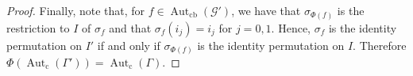 \documentclass[10pt,a4paper]{amsart}
\newcommand{\Aut}{\operatorname{Aut}}
\newcommand{\Autc}{\Aut_{\text{c}}}
\newcommand{\Autcb}{\Aut_{\text{cb}}}
\newcommand{\G}{\mathcal{G}}
\begin{document}
\begin{proof}
Finally, note that, for $f\in \Autcb(\G')$, we have that $\sigma_{\Phi(f)}$ is the restriction to $I$ of $\sigma_f$ and that $\sigma_f(i_j)=i_j$ for $j=0,1$. Hence, $\sigma_f$ is the identity permutation on $I'$ if and only if $\sigma_{\Phi(f)}$ is the identity permutation on $I$. Therefore $\Phi(\Autc(\Gamma'))=\Autc(\Gamma)$.

\end{proof}
\end{document}
